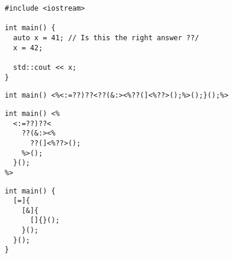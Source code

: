\begin{frame}[fragile]
  \begin{lstlisting}
#include <iostream>

int main() {
  auto x = 41; // Is this the right answer ??/
  x = 42;

  std::cout << x;
}
  \end{lstlisting}
\end{frame}
\begin{frame}[fragile]
  \begin{lstlisting}
int main() <%<:=??)??<??(&:><%??(]<%??>();%>();}();%>
  \end{lstlisting}
\end{frame}
\begin{frame}[fragile]
  \begin{lstlisting}
int main() <%
  <:=??)??<
    ??(&:><%
      ??(]<%??>();
    %>();
  }();
%>
  \end{lstlisting}
\end{frame}
\begin{frame}[fragile]
  \begin{lstlisting}
int main() {
  [=]{
    [&]{
      []{}();
    }();
  }();
}
  \end{lstlisting}
\end{frame}
